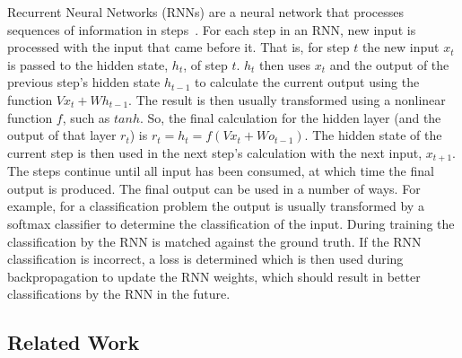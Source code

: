 Recurrent Neural Networks (RNNs) are a neural network that processes sequences of information in steps~\cite{elman1990finding}. For each step in an RNN, new input is processed with the input that came before it. That is, for step $t$ the new input $x_t$ is passed to the hidden state, $h_t$, of step $t$. $h_t$ then uses $x_t$ and the output of the previous step's hidden state $h_{t-1}$ to calculate the current output using the function $Vx_t + Wh_{t-1}$. The result is then usually transformed using a nonlinear function $f$, such as $tanh$. So, the final calculation for the hidden layer (and the output of that layer $r_t$) is $r_t = h_t = f(Vx_t + Wo_{t-1})$. The hidden state of the current step is then used in the next step's calculation with the next input, $x_{t+1}$. The steps continue until all input has been consumed, at which time the final output is produced. The final output can be used in a number of ways. For example, for a classification problem the output is usually transformed by a softmax classifier to determine the classification of the input. During training the classification by the RNN is matched against the ground truth. If the RNN classification is incorrect, a loss is determined which is then used during backpropagation to update the RNN weights, which should result in better classifications by the RNN in the future.

\subsection{Related Work}


